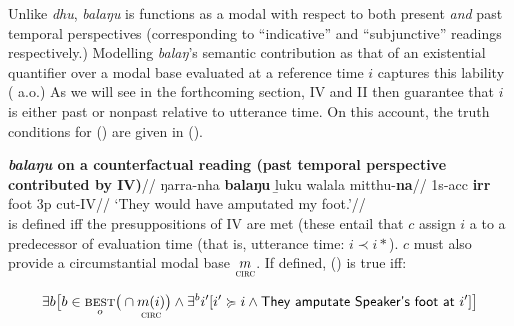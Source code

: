  Unlike \textit{dhu}, \textit{balaŋu} is functions as a modal with respect to both present \textit{and} past temporal perspectives (corresponding to ``indicative'' and ``subjunctive'' readings respectively.) Modelling \textit{balaŋ}'s semantic contribution as that of an existential quantifier over a modal base evaluated at a reference time $ i $ captures this lability  (\citealp{Condoravdi2002,Condoravdi2003} a.o.) As we will see in the forthcoming section, \gls{IV} and \gls{II} then guarantee that $ i $ is either past or nonpast relative to utterance time. On this account, the truth conditions for () are given in (\nextx).


\ex  
\begingl\glpreamble\textbf{\textit{balaŋu} on a counterfactual reading (past temporal perspective contributed by \gls{IV})}//
\gla ŋarra-nha \textbf{balaŋu} ḻuku walala mitthu-\textbf{na}//
\glb 1s-\gls{acc} \textbf{\gls{irr}} foot 3p cut-\gls{IV}//
\glft`They would have amputated my foot.'\trailingcitation{[DhG~20190417]}//\endgl\\

 is defined iff the presuppositions of \gls{IV} are met (these entail that $ c $ assign $ i $ a to a predecessor of evaluation time (that is, utterance time: $ i\prec i* $). $ c $ must also provide a circumstantial modal base $ \underset{\textsc{circ}}{m} $. If defined, () is true iff:

$$\exists b\big[b\in\underset{o}{\textsc{best}}\big(\cap\underset{\textsc{circ}}{m(i)}\big)\wedge \exists{}^b i'[i'\succcurlyeq i\wedge\textsf{They amputate Speaker's foot at }i']\big] $$

